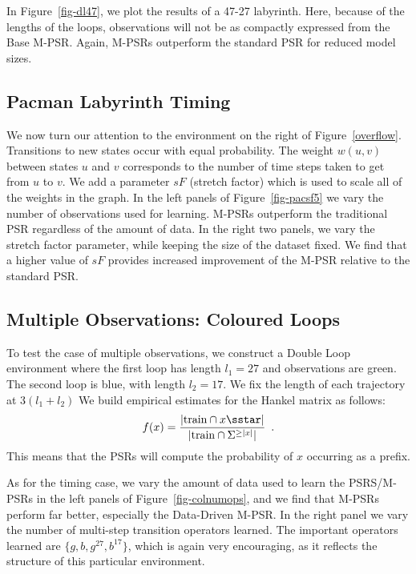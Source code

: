 
In Figure~\ref{fig-dl47}, we plot the results of a 47-27 labyrinth.  Here, because of the lengths of the loops, observations will not be as compactly expressed from the Base M-PSR. Again, M-PSRs outperform the standard PSR for reduced model sizes.



\subsection{Pacman Labyrinth Timing}


We now turn our attention to the environment on the right of Figure~\ref{overflow}. Transitions to new states occur with equal probability. The weight $w(u,v)$ between states $u$ and $v$ corresponds to the number of time steps taken to get from $u$ to $v$. We add a parameter $sF$ (stretch factor) which is used to scale all of the weights in the graph. 
In the left panels of Figure~\ref{fig-pacsf5} we vary the number of observations used for learning. M-PSRs outperform the traditional PSR regardless of the amount of data.  In the right two panels, we vary the stretch factor parameter, while  keeping the size of the dataset fixed. We find that a higher value of $sF$ provides increased improvement of the M-PSR relative to the standard PSR.

\subsection{Multiple Observations: Coloured Loops}

To test the case of multiple observations, we construct a Double Loop environment where the first loop has length $l_1=27$ and observations are green. The second loop is blue, with length $l_2=17$. We fix the length of each trajectory at 
$3 (l_1 + l_2)$
We build empirical estimates for the Hankel matrix as follows:
\begin{equation*}
f(x) = \frac{|\mathrm{train} \cap x \sstar |}{|\mathrm{train} \cap \Sigma^{\geq |x|}|} \enspace.
\end{equation*}  
This means that the PSRs will compute the probability of $x$ occurring as a prefix.


As for the timing case, we vary the amount of data used to  learn the PSRS/M-PSRs in the left panels of Figure~\ref{fig-colnumops}, and we find that M-PSRs perform far better, especially the Data-Driven M-PSR. In the right panel we vary the number of multi-step transition operators learned. The important operators learned are $\{g,b,g^{27},b^{17}\}$, which is again very encouraging, as it reflects the structure of this particular environment.


